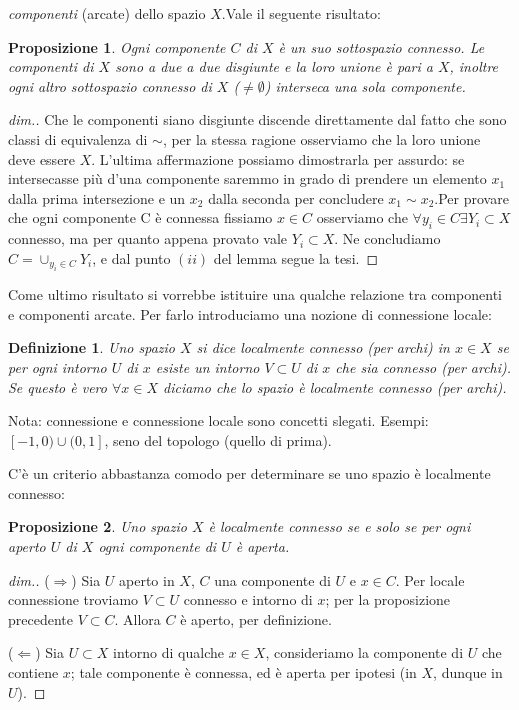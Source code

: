 \documentclass[10pt,a4paper]{article}
\theoremstyle{ilemma}
\theoremstyle{plain}
\theoremstyle{plain}
\newtheorem*{proposition}{Proposizione}
\theoremstyle{iother}
\theoremstyle{icorollary}
\theoremstyle{numcorollary}
\theoremstyle{plain}
\newtheorem*{definition}{Definizione}
\begin{document}
\emph{componenti} (arcate) dello spazio $X$.\newline Vale il seguente risultato:
\begin{proposition}
  Ogni componente $C$ di $X$ \`e un suo sottospazio connesso. Le componenti di
  $X$ sono a due a due disgiunte e la loro unione \`e pari a $X$, inoltre ogni
  altro sottospazio connesso di $X$ ($\neq\emptyset$) interseca una sola
  componente.
\end{proposition}
\begin{proof}[dim.]
  Che le componenti siano disgiunte discende direttamente dal fatto che sono
  classi di equivalenza di $\sim$, per la stessa ragione osserviamo che la loro
  unione deve essere $X$. L'ultima affermazione possiamo dimostrarla per
  assurdo: se intersecasse pi\`u d'una componente saremmo in grado di prendere
  un elemento $x_1$ dalla prima intersezione e un $x_2$ dalla seconda per
  concludere $x_1\sim x_2$.\newline Per provare che ogni componente C \`e
  connessa fissiamo $x\in C$ osserviamo che $\forall y_i\in C\exists Y_i\subset
  X$ connesso, ma per quanto appena provato vale $Y_i\subset X$. Ne concludiamo
  $C = \cup_{y_i\in C}Y_i$, e dal punto $(ii)$ del lemma segue la tesi.
\end{proof}

Come ultimo risultato si vorrebbe istituire una qualche relazione
tra componenti e componenti arcate. Per farlo introduciamo una nozione di
connessione locale:
\begin{definition}
  Uno spazio $X$ si dice localmente connesso (per archi) in $x\in X$ se per ogni
  intorno $U$ di $x$ esiste un intorno $V\subset U$ di $x$ che sia connesso (per
  archi). Se questo \`e vero $\forall x\in X$ diciamo che lo spazio \`e
  localmente connesso (per archi).
\end{definition}

Nota: connessione e connessione locale sono concetti slegati. Esempi:
$[-1,0)\cup(0,1]$, seno del topologo (quello di prima).

C'\`e un criterio abbastanza comodo per determinare se uno spazio \`e localmente
connesso:
\begin{proposition}
  Uno spazio $X$ \`e localmente connesso se e solo se per ogni aperto $U$ di $X$
  ogni componente di $U$ \`e aperta.
\end{proposition}
\begin{proof}[dim.]
  ($\Rightarrow$) Sia $U$ aperto in $X$, $C$ una componente di $U$ e $x\in
  C$. Per locale connessione troviamo $V\subset U$ connesso e intorno di $x$;
  per la proposizione precedente $V\subset C$. Allora $C$ \`e aperto, per
  definizione.

  ($\Leftarrow$) Sia $U\subset X$ intorno di qualche $x\in X$, consideriamo la
  componente di $U$ che contiene $x$; tale componente \`e connessa, ed \`e
  aperta per ipotesi (in $X$, dunque in $U$).
\end{proof}
\end{document}
